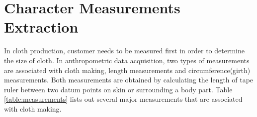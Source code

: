 
\ifx\isEmbedded\undefined

\graphicspath{{../images/}}

\fi


\chapter{Character Measurements Extraction}
\label{cha:geodesic}

In cloth production, customer needs to be measured first in order to determine the size of cloth. In anthropometric data acquisition, two types of measurements are associated with cloth making, length measurements and circumference(girth) measurements. Both measurements are obtained by calculating the length of tape ruler between two datum points on skin or surrounding a body part. Table \ref{table:measurements} lists out several major measurements that are associated with cloth making. 

